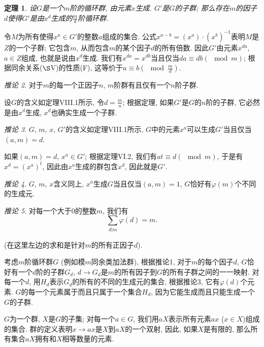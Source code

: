 \documentclass[12pt,a4paper]{book} %
\newtheorem{theorem}{定理}
\theoremstyle{remark}
\theoremstyle{example}
\theoremstyle{lemma}
\theoremstyle{corollary}
\newtheorem{corollary}[theorem]{推论}
\numberwithin{theorem}{chapter}
\begin{document}
\begin{theorem} \label{theorem:VIII_1}
设$G$是一个$m$阶的循环群, 由元素$x$生成. $G'$是$G$的子群; 那么存在$m$的因子$d$使得$G'$是由$x^d$生成的$\frac{m}{d}$阶循环群.
\end{theorem}

令$M$为所有使得$x^a \in G'$的整数$a$组成的集合. 公式$x^{a - b} = (x^a) \cdot (x^b)^{-1}$表明$M$是$Z$的一个子群; 它包含$m$, 从而包含$m$的某个因子$d$的所有倍数. 因此$G'$由元素$x^{da}$, $a \in Z$组成, 也就是说由$x^d$生成. 我们有$x^{da} = x^{db}$当且仅当$da \equiv db (\mod m)$; 根据同余关系($\S$V)的性质(F), 这等价于$a \equiv b (\mod \frac{m}{d})$.

\begin{corollary} \label{coro:VIII_1}
对于$m$的每一个正因子$n$, $m$阶群有且仅有一个$n$阶子群.
\end{corollary}

设$G$的含义如定理VIII.1所示, 令$d = \frac{m}{n}$; 根据定理, 如果$G'$是$G$的$n$阶的子群, 它必然是由$x^d$生成, $x^d$也确实生成一个子群.

\begin{corollary}
$G$, $m$, $x$, $G'$的含义如定理VIII.1所示, $G$中的元素$x^a$可以生成$G'$当且仅当$(a, m) = d$.
\end{corollary}

如果$(a, m) = d$, $x^a \in G'$; 根据定理VI.2, 我们有$at \equiv d (\mod m)$, 于是有$x^d = (x^a)^t$, 因此由$x^a$生成的群包含$x^d$, 因此就是$G'$.

\begin{corollary}
$G$, $m$, $x$含义同上, $x^a$生成$G$当且仅当$(a, m) = 1$, $G$恰好有$\varphi(m)$个不同的生成元.
\end{corollary}

\begin{corollary}
对每一个大于0的整数$m$, 我们有
\[
\sum_{d | m}{\varphi(d)} = m.
\]
\end{corollary}

(在这里左边的求和是针对$m$的所有正因子$d$).

考虑$m$阶循环群$G$ (例如模$m$同余类加法群), 根据推论1, 对于$m$的每个因子$d$, $G$恰好有一个$d$阶的子群$G_d$, $d \rightarrow G_d$是$m$的所有因子到$G$的所有子群之间的一一映射. 对每一个$d$, 用$H_d$表示$G_d$的所有的不同的生成元的集合, 根据推论3, 它有$\varphi(d)$个元素. $G$的每一个元素属于而且只属于一个集合$H_d$, 因为它能生成而且只能生成一个$G$的子群.

$G$为一个群, $X$是$G$的子集; 对每一个$a \in G$, 我们用$aX$表示所有元素$ax$ ($x \in X$)组成的集合. 群的定义表明$x \rightarrow ax$是$X$到$aX$的一个双射, 因此, 如果$X$是有限的, 那么所有集合$aX$拥有和$X$相等数量的元素.
\end{document}
